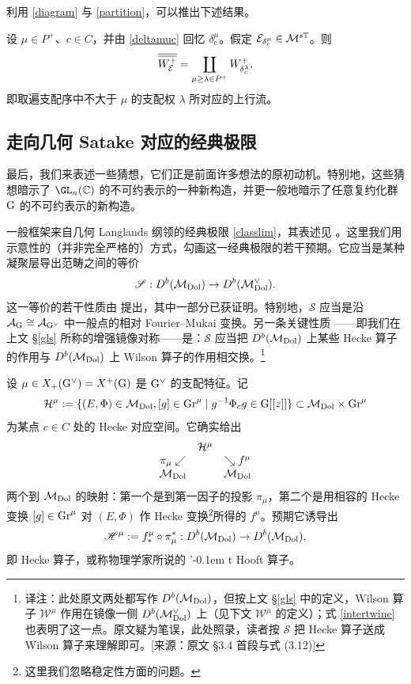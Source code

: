 利用 \eqref{diagram} 与 \eqref{partition}，可以推出下述结果。

\begin{theorem}
设 $\mu\in P^+$、$c\in C$，并由 \eqref{deltamuc} 回忆 $\delta^\mu_c$。假定 ${\mathcal E}_{\delta^\mu_c}\in {\mathcal{M}}^{s{\mathbb{T}}}$。则
\[
\overline{\overline{W^+_{\mathcal E}}}=\coprod_{\mu\geq \lambda\in P^+} W^+_{\delta^\lambda_c},
\]
即取遍支配序中不大于 $\mu$ 的支配权 $\lambda$ 所对应的上行流。
\end{theorem}

\subsection{走向几何 Satake 对应的经典极限}\label{geosat}


最后，我们来表述一些猜想，它们正是前面许多想法的原初动机。特别地，这些猜想暗示了 $\GL_n(\C)$ 的不可约表示的一种新构造，并更一般地暗示了任意复约化群 $\mathrm{G}$ 的不可约表示的新构造。

一般框架来自几何 Langlands 纲领的经典极限 \eqref{classlim}，其表述见 \cite{donagi-pantev}。这里我们用示意性的（并非完全严格的）方式，勾画这一经典极限的若干预期。它应当是某种凝聚层导出范畴之间的等价
\[
\mathscr{S}:D^b({\mathcal{M}}_{\mathrm{Dol}})\to D^b({\mathcal{M}}_{\mathrm{Dol}}^\vee).
\]
这一等价的若干性质由 \cite{donagi-pantev} 提出，其中一部分已获证明。特别地，$\mathscr{S}$ 应当是沿 ${\mathcal{A}}_{\mathrm{G}}\cong {\mathcal{A}}_{\mathrm{G}^\vee}$ 中一般点的相对 Fourier--Mukai 变换。另一条关键性质 \cite{kapustin-witten}——即我们在上文 \S\ref{gls} 所称的增强镜像对称——是：$\mathscr{S}$ 应当把 $D^b({\mathcal{M}}_{\mathrm{Dol}})$ 上某些 Hecke 算子的作用与 $D^b({\mathcal{M}}_{\mathrm{Dol}})$ 上 Wilson 算子的作用相交换。\footnote{译注：此处原文两处都写作 $D^b({\mathcal{M}}_{\mathrm{Dol}})$，但按上文 \S\ref{gls} 中的定义，Wilson 算子 $\mathscr{W}^\mu$ 作用在镜像一侧 $D^b({\mathcal{M}}^\vee_{\mathrm{Dol}})$ 上（见下文 $\mathscr{W}^\mu$ 的定义）；式 \eqref{intertwine} 也表明了这一点。原文疑为笔误，此处照录，读者按 $\mathscr{S}$ 把 Hecke 算子送成 Wilson 算子来理解即可。[来源：原文 \S 3.4 首段与式 (3.12)]}

设 $\mu\in X_+(\mathrm{G}^\vee)=X^+(\mathrm{G})$ 是 $\mathrm{G}^\vee$ 的支配特征。记
\[
\mathcal{H}^\mu:=\{(E,\Phi)\in {\mathcal{M}}_{\mathrm{Dol}}, [g]\in \textnormal{Gr}^\mu \mid g^{-1}\Phi_c g \in \mathrm{G}[[z]]\}\subset {\mathcal{M}}_{\mathrm{Dol}}\times \textnormal{Gr}^\mu
\]
为某点 $c\in C$ 处的 Hecke 对应空间。它确实给出
\[
\begin{array}{ccc}
&\mathcal{H}^\mu&\\
\pi_\mu\swarrow&&\searrow f^\mu \\
{\mathcal{M}}_{\mathrm{Dol}}&& {\mathcal{M}}_{\mathrm{Dol}}
\end{array}
\]
两个到 ${\mathcal{M}}_{\mathrm{Dol}}$ 的映射：第一个是到第一因子的投影 $\pi_\mu$，第二个是用相容的 Hecke 变换 $[g]\in \textnormal{Gr}^\mu$ 对 $(E,\Phi)$ 作 Hecke 变换\footnote{这里我们忽略稳定性方面的问题。}所得的 $f^\mu$。预期它诱导出
\[
\mathscr{H}^\mu :=f^\mu_* \circ \pi_\mu^*: D^b({\mathcal{M}}_{\mathrm{Dol}})\to  D^b({\mathcal{M}}_{\mathrm{Dol}}),
\]
即 Hecke 算子，或称物理学家所说的 '\kern-0.1em t Hooft 算子。

